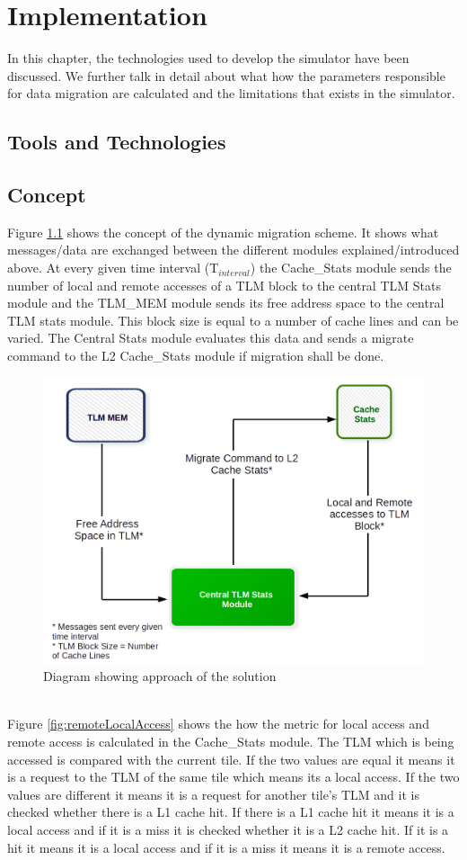 \documentclass{listhesis}
\begin{document}
\chapter{Implementation}
In this chapter, the technologies used to develop the simulator have been discussed. We further talk in detail about what how the parameters responsible for data migration are calculated and the limitations that exists in the simulator. 
\section{Tools and Technologies}

\section{Concept}
Figure \ref{fig:approachOfSolution} shows the concept of the dynamic migration scheme. It shows what messages/data are exchanged between the different modules explained/introduced above. At every given time interval (T$_{interval}$) the Cache{\_}Stats module sends the number of local and remote accesses of a TLM block to the  central TLM Stats module and the TLM{\_}MEM module sends its free address space to the central TLM stats module. This block size is equal to a number of cache lines and can be varied. The Central Stats module evaluates this data and sends a migrate command to the L2 Cache{\_}Stats module if migration shall be done.\\
\begin{figure}
  \includegraphics[width=0.7\linewidth]{approachOfSolution.png}
  \centering
  \caption{Diagram showing approach of the solution}
  \label{fig:approachOfSolution}
\end{figure}
\\
Figure \ref{fig:remoteLocalAccess} shows the how the metric for local access and remote access is calculated in the Cache{\_}Stats module. The TLM which is being accessed is compared with the current tile. If the two values are equal it means it is a request to the TLM of the same tile which means its a local access. If the two values are different it means it is a request for another tile's TLM and it is checked whether there is a L1 cache hit. If there is a L1 cache hit it means it is a local access and if it is a miss it is checked whether it is a L2 cache hit. If it is a hit it means it is a local access and if it is a miss it means it is a remote access.\\
\end{document}
